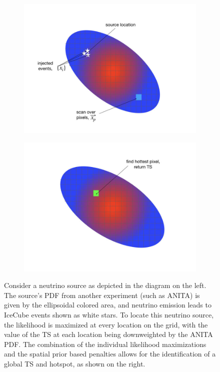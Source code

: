 \begin{figure}
\centering
\begin{subfigure}
  \centering
  \includegraphics[width=.48\linewidth]{figures/ANITA/PixelScan_ANITA.jpeg}
\end{subfigure}%
\begin{subfigure}
  \centering
  \includegraphics[width=.48\linewidth]{figures/ANITA/Hotspot_ANITA.jpeg}
\end{subfigure}
\caption[Spatial prior schematic]{Consider a neutrino source as depicted in the diagram on the left. The source's PDF from another experiment (such as ANITA) is given by the ellipsoidal colored area, and neutrino emission leads to IceCube events shown as white stars. To locate this neutrino source, the likelihood is maximized at every location on the grid, with the value of the TS at each location being downweighted by the ANITA PDF. The combination of the individual likelihood maximizations and the spatial prior based penalties allows for the identification of a global TS and hotspot, as shown on the right. }
\label{fig:spatial_prior_procedure}
\end{figure}

